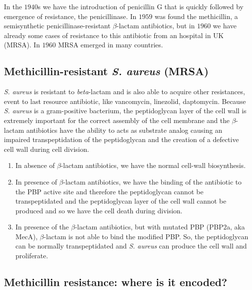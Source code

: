 In the $1940$s we have the introduction of penicillin G that is quickly followed by emergence of resistance, the penicillinase. 
In $1959$ was found the methicillin, a semisynthetic penicillinase-resistant $\beta$-lactam antibiotics, but in $1960$ we have already some cases of resistance to this antibiotic from an hospital in UK (MRSA). In $1960$ MRSA emerged in many countries. 

\subsection{Methicillin-resistant \emph{S. aureus} (MRSA)}

\emph{S. aureus} is resistant to \emph{beta}-lactam and is also able to acquire other resistances, event to last resource antibiotic, like vancomycin, linezolid, daptomycin.
Because \emph{S. aureus} is a gram-positive bacterium, the peptidoglycan layer of the cell wall is extremely important for the correct assembly of the cell membrane and the $\beta$-lactam antibiotics have the ability to acts as substrate analog causing an impaired transpeptidation of the peptidoglycan and the creation of a defective cell wall during cell division.

\begin{enumerate}
    \item In absence of $\beta$-lactam antibiotics, we have the normal cell-wall biosynthesis.
    \item In presence of $\beta$-lactam antibiotics, we have the binding of the antibiotic to the PBP active site and therefore the peptidoglycan cannot be transpeptidated and the peptidoglycan layer of the cell wall cannot be produced and so we have the cell death during division. 
    \item In presence of the $\beta$-lactam antibiotics, but with mutated PBP (PBP$2$a, aka MecA), $\beta$-lactam is not able to bind the modified PBP. So, the peptidoglycan can be normally transpeptidated and \emph{S. aureus} can produce the cell wall and proliferate. 
\end{enumerate}

\subsection{Methicillin resistance: where is it encoded?}

